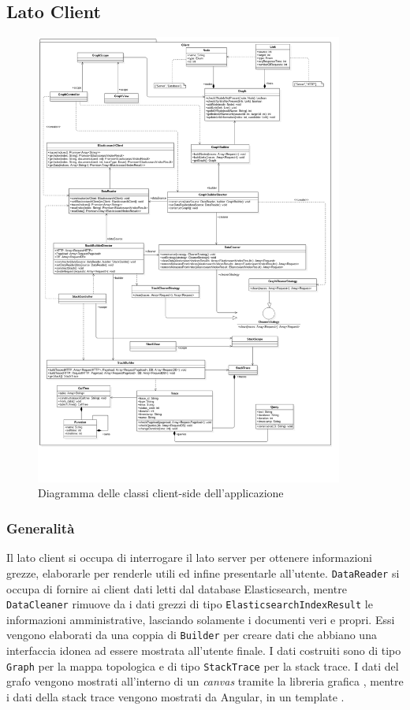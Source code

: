 
\subsection{Lato Client}
\label{sec:latoClient}

\begin{figure}[H]
    \centering
    \includegraphics[width=0.9\textwidth]{Images/classi.png}
    \caption{Diagramma delle classi client-side dell'applicazione}
    \label{img:diagrammaClassiClient}
\end{figure}

\subsubsection{Generalità}
Il lato client si occupa di interrogare il lato server per ottenere informazioni grezze, elaborarle per renderle utili ed infine presentarle all'utente. \texttt{DataReader} si occupa di fornire ai client dati letti dal database Elasticsearch, mentre \texttt{DataCleaner} rimuove da i dati grezzi di tipo \texttt{ElasticsearchIndexResult} le informazioni amministrative, lasciando solamente i documenti veri e propri. Essi vengono elaborati da una coppia di \texttt{Builder} per creare dati che abbiano una interfaccia idonea ad essere mostrata all'utente finale. I dati costruiti sono di tipo \texttt{Graph} per la mappa topologica e di tipo \texttt{StackTrace} per la stack trace. I dati del grafo vengono mostrati all'interno di un \emph{canvas} tramite la libreria grafica , mentre i dati della stack trace vengono mostrati da Angular, in un template . 

